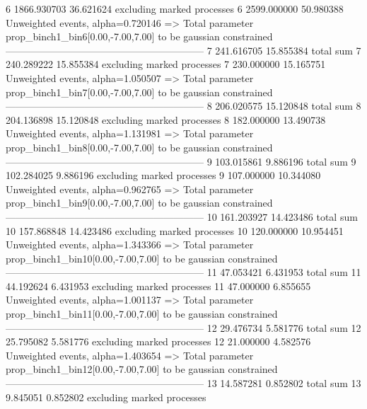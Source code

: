 6          1866.930703     36.621624       excluding marked processes    
6          2599.000000     50.980388       Unweighted events, alpha=0.720146
  => Total parameter prop_binch1_bin6[0.00,-7.00,7.00] to be gaussian constrained
------------------------------------------------------------
7          241.616705      15.855384       total sum                     
7          240.289222      15.855384       excluding marked processes    
7          230.000000      15.165751       Unweighted events, alpha=1.050507
  => Total parameter prop_binch1_bin7[0.00,-7.00,7.00] to be gaussian constrained
------------------------------------------------------------
8          206.020575      15.120848       total sum                     
8          204.136898      15.120848       excluding marked processes    
8          182.000000      13.490738       Unweighted events, alpha=1.131981
  => Total parameter prop_binch1_bin8[0.00,-7.00,7.00] to be gaussian constrained
------------------------------------------------------------
9          103.015861      9.886196        total sum                     
9          102.284025      9.886196        excluding marked processes    
9          107.000000      10.344080       Unweighted events, alpha=0.962765
  => Total parameter prop_binch1_bin9[0.00,-7.00,7.00] to be gaussian constrained
------------------------------------------------------------
10         161.203927      14.423486       total sum                     
10         157.868848      14.423486       excluding marked processes    
10         120.000000      10.954451       Unweighted events, alpha=1.343366
  => Total parameter prop_binch1_bin10[0.00,-7.00,7.00] to be gaussian constrained
------------------------------------------------------------
11         47.053421       6.431953        total sum                     
11         44.192624       6.431953        excluding marked processes    
11         47.000000       6.855655        Unweighted events, alpha=1.001137
  => Total parameter prop_binch1_bin11[0.00,-7.00,7.00] to be gaussian constrained
------------------------------------------------------------
12         29.476734       5.581776        total sum                     
12         25.795082       5.581776        excluding marked processes    
12         21.000000       4.582576        Unweighted events, alpha=1.403654
  => Total parameter prop_binch1_bin12[0.00,-7.00,7.00] to be gaussian constrained
------------------------------------------------------------
13         14.587281       0.852802        total sum                     
13         9.845051        0.852802        excluding marked processes    
